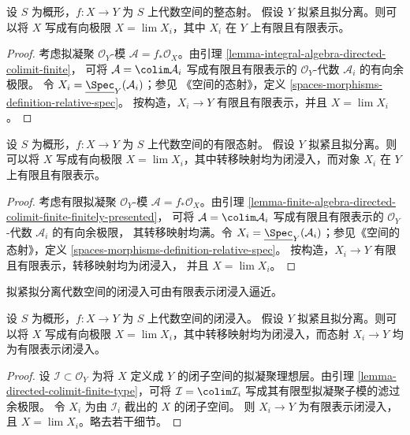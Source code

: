 \begin{lemma}
\label{lemma-integral-limit-finite-and-finite-presentation}
设 $S$ 为概形，$f : X \to Y$ 为 $S$ 上代数空间的整态射。
假设 $Y$ 拟紧且拟分离。则可以将 $X$ 写成有向极限
$X = \lim X_i$，其中 $X_i$ 在 $Y$ 上有限且有限表示。
\end{lemma}

\begin{proof}
考虑拟凝聚 $\mathcal{O}_Y$-模
$\mathcal{A} = f_*\mathcal{O}_X$。由引理
\ref{lemma-integral-algebra-directed-colimit-finite}，
可将 $\mathcal{A} = \colim \mathcal{A}_i$ 写成有限且有限表示的
$\mathcal{O}_Y$-代数 $\mathcal{A}_i$ 的有向余极限。
令 $X_i = \underline{\Spec}_Y(\mathcal{A}_i)$；参见
《空间的态射》，定义
\ref{spaces-morphisms-definition-relative-spec}。
按构造，$X_i \to Y$ 有限且有限表示，并且 $X = \lim X_i$。
\end{proof}

\begin{lemma}
\label{lemma-finite-in-finite-and-finite-presentation}
设 $S$ 为概形，$f : X \to Y$ 为 $S$ 上代数空间的有限态射。
假设 $Y$ 拟紧且拟分离。则可以将 $X$ 写成有向极限
$X = \lim X_i$，其中转移映射均为闭浸入，而对象
$X_i$ 在 $Y$ 上有限且有限表示。
\end{lemma}

\begin{proof}
考虑有限拟凝聚 $\mathcal{O}_Y$-模
$\mathcal{A} = f_*\mathcal{O}_X$。由引理
\ref{lemma-finite-algebra-directed-colimit-finite-finitely-presented}，
可将 $\mathcal{A} = \colim \mathcal{A}_i$ 写成有限且有限表示的
$\mathcal{O}_Y$-代数 $\mathcal{A}_i$ 的有向余极限，
其转移映射均满。令
$X_i = \underline{\Spec}_Y(\mathcal{A}_i)$；参见《空间的态射》，定义
\ref{spaces-morphisms-definition-relative-spec}。
按构造，$X_i \to Y$ 有限且有限表示，转移映射均为闭浸入，
并且 $X = \lim X_i$。
\end{proof}

\begin{lemma}
\label{lemma-closed-is-limit-closed-and-finite-presentation}
\begin{slogan}
拟紧拟分离代数空间的闭浸入可由有限表示闭浸入逼近。
\end{slogan}
设 $S$ 为概形，$f : X \to Y$ 为 $S$ 上代数空间的闭浸入。
假设 $Y$ 拟紧且拟分离。则可以将 $X$ 写成有向极限
$X = \lim X_i$，其中转移映射均为闭浸入，而态射
$X_i \to Y$ 均为有限表示闭浸入。
\end{lemma}

\begin{proof}
设 $\mathcal{I} \subset \mathcal{O}_Y$ 为将 $X$ 定义成 $Y$
的闭子空间的拟凝聚理想层。由引理
\ref{lemma-directed-colimit-finite-type}，可将
$\mathcal{I} = \colim \mathcal{I}_i$ 写成其有限型拟凝聚子模的滤过余极限。
令 $X_i$ 为由 $\mathcal{I}_i$ 截出的 $X$ 的闭子空间。
则 $X_i \to Y$ 为有限表示闭浸入，且 $X = \lim X_i$。略去若干细节。
\end{proof}

